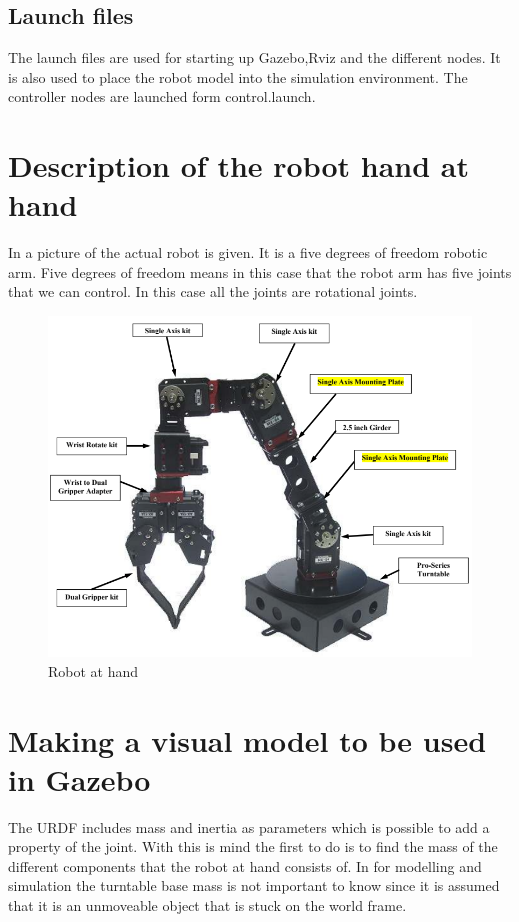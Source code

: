 \subsection{Launch files}
The launch files are used for starting up Gazebo,Rviz and the different nodes. It is also used to place the robot model into the simulation environment. The controller nodes are launched form control.launch.





\section{Description of the robot hand at hand}
In  a picture of the actual robot is given. It is a five degrees of freedom robotic arm. Five degrees of freedom means in this case that the robot arm has five joints that we can control. In this case all the joints are rotational joints. 

\begin{figure}[htbp]
  \centering
  \includegraphics[width=.7\textwidth]{img/robotAH.png}
  \caption{Robot at hand}
  \label{fig:robotAH}
\end{figure}


\section{Making a visual model to be used in Gazebo}
The URDF includes mass and inertia as parameters which is possible to add a property of the joint. With this is mind the first to do is to find the mass of the different components that the robot at hand consists of. In  for modelling and simulation the turntable base mass is not important to know since it is assumed that it is an unmoveable object that is stuck on the world frame. \\

